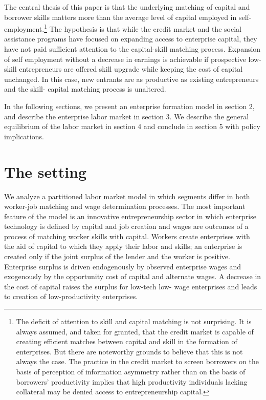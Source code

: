 \documentclass[
  a4paper,
  DIV=11,
  numbers=noendperiod]{scrartcl}
\begin{document}
The central thesis of this paper is that the underlying matching of
capital and borrower skills matters more than the average level of
capital employed in self-employment.\footnote{The deficit of attention
  to skill and capital matching is not surprising. It is always assumed,
  and taken for granted, that the credit market is capable of creating
  efficient matches between capital and skill in the formation of
  enterprises. But there are noteworthy grounds to believe that this is
  not always the case. The practice in the credit market to screen
  borrowers on the basis of perception of information asymmetry rather
  than on the basis of borrowers' productivity implies that high
  productivity individuals lacking collateral may be denied access to
  entrepreneurship capital.} The hypothesis is that while the credit
market and the social assistance programs have focused on expanding
access to enterprise capital, they have not paid sufficient attention to
the capital-skill matching process. Expansion of self employment without
a decrease in earnings is achievable if prospective low-skill
entrepreneurs are offered skill upgrade while keeping the cost of
capital unchanged. In this case, new entrants are as productive as
existing entrepreneurs and the skill- capital matching process is
unaltered.

In the following sections, we present an enterprise formation model in
section 2, and describe the enterprise labor market in section 3. We
describe the general equilibrium of the labor market in section 4 and
conclude in section 5 with policy implications.

\hypertarget{the-setting}{%
\section{The setting}\label{the-setting}}

We analyze a partitioned labor market model in which segments differ in
both worker-job matching and wage determination processes. The most
important feature of the model is an innovative entrepreneurship sector
in which enterprise technology is defined by capital and job creation
and wages are outcomes of a process of matching worker skills with
capital. Workers create enterprises with the aid of capital to which
they apply their labor and skills; an enterprise is created only if the
joint surplus of the lender and the worker is positive. Enterprise
surplus is driven endogenously by observed enterprise wages and
exogenously by the opportunity cost of capital and alternate wages. A
decrease in the cost of capital raises the surplus for low-tech low-
wage enterprises and leads to creation of low-productivity enterprises.
\end{document}
